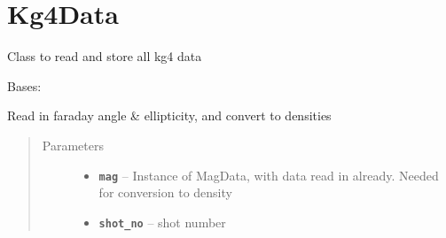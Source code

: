\documentclass[letterpaper,10pt,english]{sphinxmanual}
\begin{document}
\section{Kg4Data}
\label{kg4_data:kg4data}\label{kg4_data:module-kg4_data}\label{kg4_data::doc}
Class to read and store all kg4 data

\begin{fulllineitems}
\label{kg4_data:kg4_data.Kg4Data}
Bases: 

\begin{fulllineitems}
\label{kg4_data:kg4_data.Kg4Data.CIB}
\end{fulllineitems}


\begin{fulllineitems}
\label{kg4_data:kg4_data.Kg4Data.MIN_FAR}
\end{fulllineitems}


\begin{fulllineitems}
\label{kg4_data:kg4_data.Kg4Data.read_data}
Read in faraday angle \& ellipticity, and convert to densities
\begin{quote}\begin{description}
\item[{Parameters}] \leavevmode\begin{itemize}
\item {} 
\textbf{\texttt{mag}} -- Instance of MagData, with data read in already. Needed for conversion to density

\item {} 
\textbf{\texttt{shot\_no}} -- shot number

\end{itemize}

\end{description}\end{quote}

\end{fulllineitems}


\end{fulllineitems}
\end{document}
